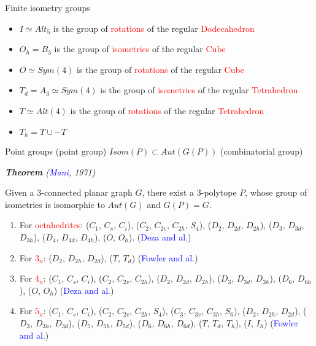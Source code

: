 \documentclass[%
pdf,
colorBG,
slideColor,
]{prosper}
\begin{document}
{\begin{slide}{Finite isometry groups}
{\begin{itemize}
\item $I\simeq Alt_5$ is the group of \textcolor{red}{rotations} of the regular \textcolor{red}{Dodecahedron}
\item $O_h=B_3$ is the group of \textcolor{red}{isometries} of the regular \textcolor{red}{Cube}
\item $O\simeq Sym(4)$ is the group of \textcolor{red}{rotations} of the regular \textcolor{red}{Cube}
\item $T_d=A_3\simeq Sym(4)$ is the group of \textcolor{red}{isometries} of the regular \textcolor{red}{Tetrahedron}
\item $T\simeq Alt(4)$ is the group of \textcolor{red}{rotations} of the regular \textcolor{red}{Tetrahedron}
\item $T_h=T\cup -T$
\end{itemize}
}


\end{slide}
}





\begin{slide}{Point groups}
\vspace{-2mm}
(point group) $Isom(P)\subset Aut(G(P))$ (combinatorial group)

{\em {\bf Theorem} (\textcolor{blue}{Mani}, 1971)

Given a $3$-connected planar graph $G$, there exist a $3$-polytope $P$, whose group of isometries is isomorphic to $Aut(G)$ and $G(P)=G$.
}

\begin{enumerate}
\item[\ding{108}] For \textcolor{red}{octahedrites}: ($C_{1}$, $C_s$, $C_i$), ($C_2$, $C_{2v}$, $C_{2h}$, $S_4$), ($D_2$, $D_{2d}$, $D_{2h}$), ($D_3$, $D_{3d}$, $D_{3h}$), ($D_4$, $D_{4d}$, $D_{4h}$), ($O$, $O_h$).
(\textcolor{blue}{Deza and al.})
\item[\ding{108}] For \textcolor{red}{$3_n$}: ($D_{2}$, $D_{2h}$, $D_{2d}$), ($T$, $T_d$) (\textcolor{blue}{Fowler and al.})
\item[\ding{108}] For \textcolor{red}{$4_n$}: ($C_1$, $C_s$, $C_{i}$),
($C_2$, $C_{2v}$, $C_{2h}$), ($D_2$, $D_{2d}$, $D_{2h}$), ($D_3$, $D_{3d}$, $D_{3h}$), ($D_6$, $D_{6h}$), ($O$, $O_h$) (\textcolor{blue}{Deza and al.})
\item[\ding{108}] For \textcolor{red}{$5_n$}: 
($C_1$, $C_s$, $C_i$), ($C_2$, $C_{2v}$, $C_{2h}$, $S_4$), ($C_3$, $C_{3v}$, $C_{3h}$, $S_6$), ($D_2$, $D_{2h}$, $D_{2d}$), ($D_3$, $D_{3h}$, $D_{3d}$), ($D_5$, $D_{5h}$, $D_{5d}$), ($D_6$, $D_{6h}$, $D_{6d}$), ($T$, $T_d$, $T_h$), ($I$, $I_h$) (\textcolor{blue}{Fowler and al.})
\end{enumerate}

\end{slide}
\end{document}
